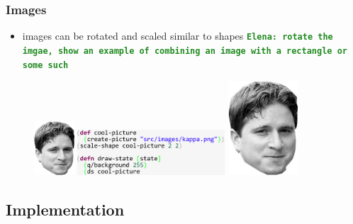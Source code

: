 \documentclass{beamer}
\newcommand{\comment}[1]{{\bf \tt  {#1}}}
\newcommand{\emcomment}[1]{\textcolor{ForestGreen}{\comment{Elena: {#1}}}}
\begin{document}
\begin{frame}
\frametitle{Images}
	\begin{itemize}
		\item images can be rotated and scaled similar to shapes \emcomment{rotate the imgae, show an example of combining an image with a rectangle or some such}
	\end{itemize}
	\begin{figure}
		\vspace{-0.3cm}
		\includegraphics[width=1.5cm]{PresentationImages/kappa96x130.png}
		\hspace{0.4cm}
		\includegraphics[width=5.5cm]{PresentationImages/pictureCode.pdf}
		\hspace{0.4cm}
		\includegraphics[width=2.6cm]{PresentationImages/kappa96x130.png}
	\end{figure}

\end{frame}


\subsection{Implementation}
\end{document}
